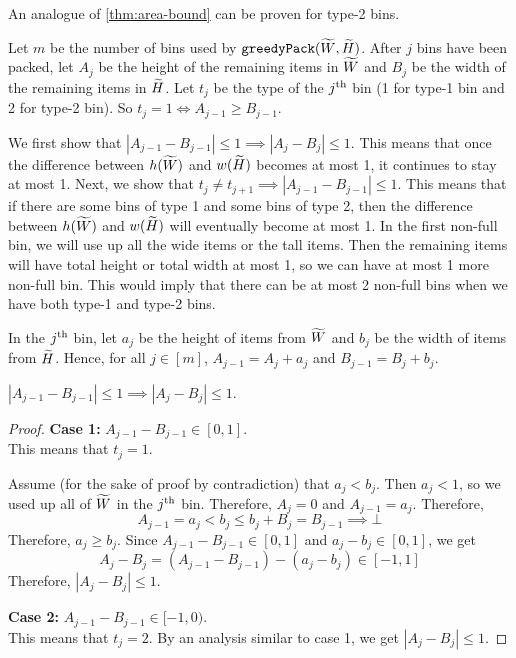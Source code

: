 An analogue of \cref{thm:area-bound} can be proven for type-2 bins.

Let $m$ be the number of bins used by $\operatorname{\mathtt{greedyPack}}(\widetilde{W}, \widetilde{H})$.
After $j$ bins have been packed, let $A_j$ be the height of the remaining items in $\widetilde{W}$
and $B_j$ be the width of the remaining items in $\widetilde{H}$.
Let $t_j$ be the type of the $j^{\textrm{th}}$ bin (1 for type-1 bin and 2 for type-2 bin).
So $t_j = 1 \iff A_{j-1} \ge B_{j-1}$.

We first show that $|A_{j-1} - B_{j-1}| \le 1 \implies |A_j - B_j| \le 1$.
This means that once the difference between $h(\widetilde{W})$ and $w(\widetilde{H})$ becomes at most 1,
it continues to stay at most 1.
Next, we show that $t_j \neq t_{j+1} \implies |A_{j-1} - B_{j-1}| \le 1$.
This means that if there are some bins of type 1 and some bins of type 2,
then the difference between $h(\widetilde{W})$ and $w(\widetilde{H})$ will eventually become at most 1.
In the first non-full bin, we will use up all the wide items or the tall items.
Then the remaining items will have total height or total width at most 1,
so we can have at most 1 more non-full bin.
This would imply that there can be at most 2 non-full bins
when we have both type-1 and type-2 bins.

In the $j^{\textrm{th}}$ bin, let $a_j$ be the height of items from $\widetilde{W}$
and $b_j$ be the width of items from $\widetilde{H}$.
Hence, for all $j \in [m]$,
$A_{j-1} = A_j + a_j$ and $B_{j-1} = B_j + b_j$.

\begin{lemma}
\label{thm:diff-capture}
$|A_{j-1} - B_{j-1}| \le 1 \implies |A_j - B_j| \le 1$.
\end{lemma}
\begin{proof}
\textbf{Case 1:} $A_{j-1} - B_{j-1} \in [0, 1]$.
\\ This means that $t_j = 1$.

Assume (for the sake of proof by contradiction) that $a_j < b_j$.
Then $a_j < 1$, so we used up all of $\widetilde{W}$ in the $j^{\textrm{th}}$ bin.
Therefore, $A_j = 0$ and $A_{j-1} = a_j$. Therefore,
\[ A_{j-1} = a_j < b_j \le b_j + B_j = B_{j-1} \implies \bot \]
Therefore, $a_j \ge b_j$. Since $A_{j-1} - B_{j-1} \in [0, 1]$
and $a_j - b_j \in [0, 1]$, we get
\[ A_j - B_j = (A_{j-1} - B_{j-1}) - (a_j - b_j) \in [-1, 1] \]
Therefore, $|A_j - B_j| \le 1$.

\textbf{Case 2:} $A_{j-1} - B_{j-1} \in [-1, 0)$.
\\ This means that $t_j = 2$.
By an analysis similar to case 1, we get $|A_j - B_j| \le 1$.
\end{proof}

